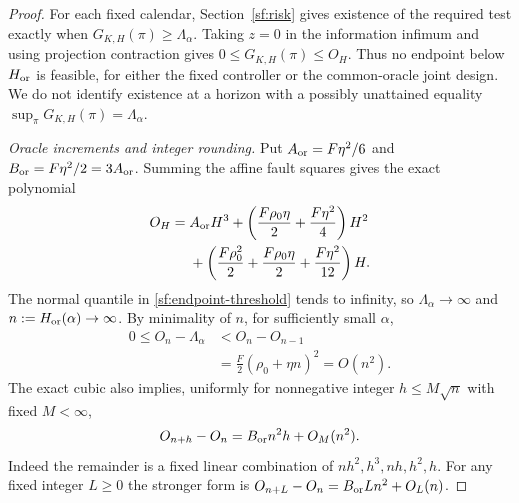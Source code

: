 \documentclass[journal]{IEEEtran}
\begin{document}
\begin{proof}\leavevmode
For each fixed calendar, Section~\ref{sf:risk} gives existence of the
required test exactly when $G_{K,H}(\pi)\ge\Lambda_\alpha$.
Taking $z=0$ in the information infimum and using projection contraction
gives $0\le G_{K,H}(\pi)\le O_H$. Thus no endpoint below
$H_{\rm or}$ is feasible, for either the fixed controller or the common-oracle
joint design. We do not identify existence at a horizon with a possibly
unattained equality $\sup_\pi G_{K,H}(\pi)=\Lambda_\alpha$.

\par\smallskip\noindent\emph{Oracle increments and integer rounding.}
Put $A_{\rm or}=F\eta^2/6$ and $B_{\rm or}=F\eta^2/2=3A_{\rm or}$.
Summing the affine fault squares gives the exact polynomial
\begin{equation}\label{sf:endpoint-oracle-polynomial}
\begin{aligned}
O_H={}&A_{\rm or}H^3
 +\left(\frac{F\rho_0\eta}{2}+\frac{F\eta^2}{4}\right)H^2\\
&+\left(\frac{F\rho_0^2}{2}
 +\frac{F\rho_0\eta}{2}+\frac{F\eta^2}{12}\right)H.
\end{aligned}
\end{equation}
The normal quantile in \eqref{sf:endpoint-threshold} tends to infinity,
so $\Lambda_\alpha\to\infty$ and $n:=H_{\rm or}(\alpha)\to\infty$.
By minimality of $n$, for sufficiently small $\alpha$,
\begin{equation}\label{sf:endpoint-overshoot}
\begin{aligned}
0\le O_n-\Lambda_\alpha
 &<O_n-O_{n-1}\\
 &=\tfrac F2(\rho_0+\eta n)^2=O(n^2).
\end{aligned}
\end{equation}
The exact cubic also implies, uniformly for nonnegative integer
$h\le M\sqrt n$ with fixed $M<\infty$,
\begin{equation}\label{sf:endpoint-increment}
O_{n+h}-O_n=B_{\rm or}n^2h+O_M(n^2).
\end{equation}
Indeed the remainder is a fixed linear combination of
$nh^2,h^3,nh,h^2,h$. For any fixed integer $L\ge0$ the stronger form is
$O_{n+L}-O_n=B_{\rm or}Ln^2+O_L(n)$.


\end{proof}
\end{document}
